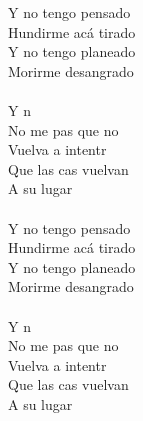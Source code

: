 \begin{cancion}[Arrancármelo][Wos]
\begin{chorus}
	 Y no tengo pensado\\
	 Hundirme acá tirado\\
	 Y no tengo planeado\\
	 Morirme desangrado\\
\jump\\
	Y n\\
	No me pas que no\\
	Vuelva a intentr\\
	Que las cas vuelvan\\
A su lugar\\
\jump\\
	 Y no tengo pensado\\
	 Hundirme acá tirado\\
	 Y no tengo planeado\\
	 Morirme desangrado\\
\jump\\
	Y n\\
	No me pas que no\\
	Vuelva a intentr\\
	Que las cas vuelvan\\
A su lugar\\
	\end{chorus}%
	\jump\\
\end{cancion}%
